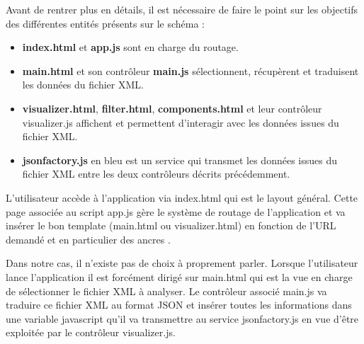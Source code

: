 \documentclass [a4paper,11pt]{article}
\begin{document}
  
Avant de rentrer plus en détails, il est nécessaire de faire le point sur les objectifs des différentes entités présents sur le schéma :
\newline

\begin{itemize}
 \item \textbf{index.html} et \textbf{app.js} sont en charge du routage.
 \item \textbf{main.html} et son contrôleur \textbf{main.js} sélectionnent, récupèrent et traduisent les données du fichier XML.
 \item \textbf{visualizer.html}, \textbf{filter.html}, \textbf{components.html} et leur contrôleur visualizer.js affichent et permettent d’interagir avec les données issues du fichier XML.
 \item \textbf{jsonfactory.js} en bleu est un service qui transmet les données issues du fichier XML entre les deux contrôleurs décrits précédemment.
 \newline
\end{itemize}

L’utilisateur accède à l’application via index.html qui est le layout général. Cette page associée au script app.js gère le système de routage de l’application et va insérer le bon template (main.html ou visualizer.html) en fonction de l’URL demandé et en particulier des ancres \cite{Landazuri16}.
\newline

Dans notre cas, il n’existe pas de choix à proprement parler. Lorsque l’utilisateur lance l’application il est forcément dirigé sur main.html qui est la vue en charge de sélectionner le fichier XML à analyser. Le contrôleur associé main.js va traduire ce fichier XML au format JSON et insérer toutes les informations dans une variable javascript qu’il va transmettre au service jsonfactory.js en vue d’être exploitée par le contrôleur visualizer.js.
\newline
\end{document}
